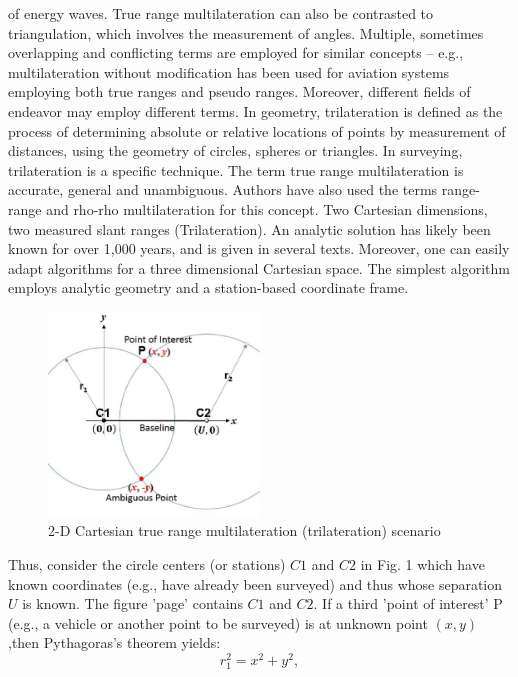 of energy waves. True range multilateration can also be contrasted to triangulation, 
which involves the measurement of angles.
Multiple, sometimes overlapping and conflicting terms are employed for similar concepts – e.g., 
multilateration without modification has been used for aviation systems employing both true ranges
and pseudo ranges. Moreover, different fields of endeavor may employ different terms. 
In geometry, trilateration is defined as the process of determining absolute or relative locations 
of points by measurement of distances, using the geometry of circles, spheres or triangles.
In surveying, trilateration is a specific technique. The term true range multilateration is 
accurate, general and unambiguous. Authors have also used the terms range-range and rho-rho 
multilateration for this concept.
Two Cartesian dimensions, two measured slant ranges (Trilateration). 
An analytic solution has likely been known for over 1,000 years, and is given in several texts.
Moreover, one can easily adapt algorithms for a three dimensional Cartesian space.
The simplest algorithm employs analytic geometry and a station-based coordinate frame.
\begin{figure}[htb] 
	\label{fig:two_beacon_local}
	\centering
	\includegraphics[width=0.5\textwidth]{figures/two_beacon_local}
	\caption{2-D Cartesian true range multilateration (trilateration) scenario}
\end{figure}
Thus, consider the circle centers (or stations) $C1$ and $C2$ in Fig. 1 which have known 
coordinates (e.g., have already been surveyed) and thus whose separation $U$ is known. 
The figure 'page' contains $C1$ and $C2$. If a third 'point of interest' P (e.g., a vehicle or
another point to be surveyed) is at unknown point $(x,y)$  ,then Pythagoras's theorem yields:
\begin{equation}
	\label{equ:ptyhagoras1}
	r_{1}^{2} = x^{2} + y^{2},
\end{equation}
